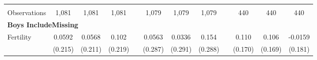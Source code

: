 \begin{landscape}
\begin{table}[htpb!]
\begin{center}
\begin{tabular}{lcccp{2mm}cccp{2mm}ccc}
\begin{footnotesize}\end{footnotesize}&\begin{footnotesize}\end{footnotesize}&\begin{footnotesize}\end{footnotesize}&\begin{footnotesize}\end{footnotesize}&\begin{footnotesize}\end{footnotesize}&\begin{footnotesize}\end{footnotesize}&\begin{footnotesize}\end{footnotesize}&\begin{footnotesize}\end{footnotesize}&\begin{footnotesize}\end{footnotesize}&\begin{footnotesize}\end{footnotesize}&\begin{footnotesize}\end{footnotesize}&\begin{footnotesize}\end{footnotesize}\\Observations&1,081&1,081&1,081&&1,079&1,079&1,079&&440&440&440\\
\multicolumn{12}{l}{\textbf{Boys IncludeMissing}}\\ 
Fertility&0.0592&0.0568&0.102&&0.0563&0.0336&0.154&&0.110&0.106&-0.0159\\
&(0.215)&(0.211)&(0.219)&&(0.287)&(0.291)&(0.288)&&(0.170)&(0.169)&(0.181)\\

\end{tabular}
\end{center}
\end{table}
\end{landscape}
